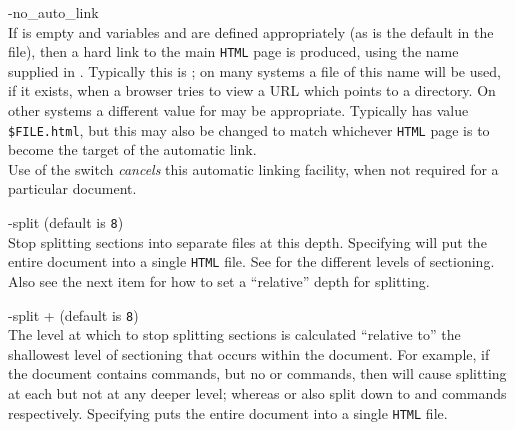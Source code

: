 \begin{htmllist}
\item [ -no\_auto\_link\label{cs_noautolink}]
\\
If  is empty and variables  
and  are defined appropriately
(as is the default in the  file),
then a hard link to the main \texttt{HTML} page is produced,
using the name supplied in . Typically this is ; 
on many systems a file of this name will be used, if it exists,
when a browser tries to view a URL which points to a directory.
On other systems a different value for  may be appropriate.
Typically  has value \texttt{\$FILE.html}, but
this may also be changed to match whichever \texttt{HTML} page
is to become the target of the automatic link.\\
Use of the  switch \emph{cancels} 
this automatic linking facility, 
when not required for a particular document.

%

\item [ -split \Meta{num}\label{cs_splitdepth}]
 (default is \texttt{8})\\
Stop splitting sections into separate files at this depth.
Specifying  will put the entire document into a 
single \texttt{HTML} file. See  for
the different levels of sectioning. Also see the next item for
how to set a ``relative'' depth for splitting.%

\item [ -split +\Meta{num}\label{cs_reldepth}]
 (default is \texttt{8})\\
The level at which to stop splitting sections is calculated ``relative to'' 
the shallowest level of sectioning that occurs within the document.
For example, if the document contains  commands, but no 
or  commands, then  will cause splitting at each 
but not at any deeper level; whereas  or  also split down to 
 and  commands respectively.
Specifying  puts the entire document into a single \texttt{HTML} file.


%


\end{htmllist}
